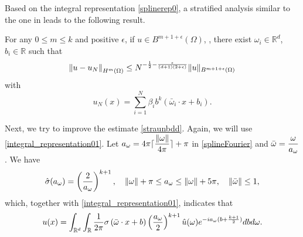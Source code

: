 Based on the integral representation \eqref{splinerep0}, a stratified analysis similar to the one in \cite{siegel2020approximations} leads to the following result.
\begin{theorem}
For any $0\le m\le k$ and positive $\epsilon$,  if $u\in {B}^{m+1+\epsilon}(\Omega)$, , there exist $\omega_i\in \mathbb{R}^d$, $b_i\in \mathbb{R}$ such that
\begin{equation}\label{straunbdd}
\left\|u - u_{N}\right\|_{H^{m}(\Omega)}\le  N^{-{1\over 2}-{\epsilon \over (d+1)(2+\epsilon)}} \|u\|_{{B}^{m+1+\epsilon}(\Omega)}
\end{equation}
with
\begin{equation}
u_{N}(x)=\sum_{i=1}^{N} \beta_i b^k\left(\bar \omega_i\cdot x+b_i\right) .
\end{equation} 
\end{theorem}
Next, we try to improve the estimate \eqref{straunbdd}. Again, we will use \eqref{integral_representation01}. Let $\displaystyle a_\omega=4\pi\lceil {\|\omega\|\over 4\pi}\rceil + \pi$ in \eqref{splineFourier} and $\displaystyle \bar\omega ={\omega\over a_\omega}$. We have
 \begin{equation}
\hat{\sigma}(a_\omega)=\left({2\over a_\omega}\right)^{k+1}, \quad \|\omega\| + \pi\le a_\omega\le \|\omega\|+5\pi,\quad \|\bar\omega\|\le 1,
 \end{equation}
which, together with \eqref{integral_representation01}, indicates that
 \begin{equation}\label{integral_representation}
 \begin{split}
  u(x) =  \int_{\mathbb{R}^d}\int_\mathbb{R}\frac{1}{2\pi}
  \sigma\left(\bar \omega\cdot x+b\right)\left({a_\omega\over 2}\right)^{k+1}\hat{u}(\omega)e^{-ia_\omega(b+{k+1\over 2})}dbd\omega.
\end{split}
 \end{equation}


